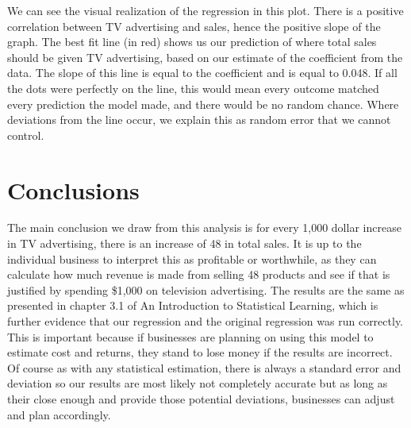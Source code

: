\documentclass{article}\usepackage[]{graphicx}\usepackage[]{color}
\begin{document}
We can see the visual realization of the regression in this plot. There is a positive correlation between TV advertising and sales, hence the positive slope of the graph. The best fit line (in red) shows us our prediction of where total sales should be given TV advertising, based on our estimate of the coefficient from the data. The slope of this line is equal to the coefficient and is equal to 0.048. If all the dots were perfectly on the line, this would mean every outcome matched every prediction the model made, and there would be no random chance. Where deviations from the line occur, we explain this as random error that we cannot control. 

\section{Conclusions}

The main conclusion we draw from this analysis is for every 1,000 dollar increase in TV advertising, there is an increase of 48 in total sales. It is up to the individual business to interpret this as profitable or worthwhile, as they can calculate how much revenue is made from selling 48 products and see if that is justified by spending \$1,000 on television advertising. The results are the same as presented in chapter 3.1 of An Introduction to Statistical Learning, which is further evidence that our regression and the original regression was run correctly. This is important because if businesses are planning on using this model to estimate cost and returns, they stand to lose money if the results are incorrect. Of course as with any statistical estimation, there is always a standard error and deviation so our results are most likely not completely accurate but as long as their close enough and provide those potential deviations, businesses can adjust and plan accordingly. 
\end{document}
